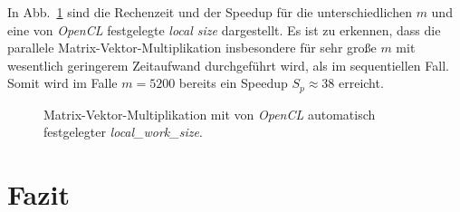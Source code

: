 \documentclass[
	ngerman,
	ruledheaders=section,
	class=report,
	thesis={type=Dokumentation},
	ignore-missing-data=true,
	accentcolor=9c,
	custommargins=false,
	marginpar=false,
	parskip=half-,
	fontsize=11pt,
]{tudapub}
\begin{document}
In Abb.~\ref{auto_lws} sind die Rechenzeit und der Speedup für die unterschiedlichen $m$ und eine von \textit{OpenCL} festgelegte \textit{local size} dargestellt. Es ist zu erkennen, dass die parallele Matrix-Vektor-Multiplikation insbesondere für sehr große $m$ mit wesentlich geringerem Zeitaufwand durchgeführt wird, als im sequentiellen Fall. Somit wird im Falle $m = 5200$ bereits ein Speedup $S_p \approx 38$ erreicht.
\begin{figure}[h!tb]
	\centering
	\hspace{1cm}
	\caption{Matrix-Vektor-Multiplikation mit von \textit{OpenCL} automatisch festgelegter \textit{local\_work\_size}.}
	\label{auto_lws}
\end{figure}

\chapter{Fazit}
\end{document}
